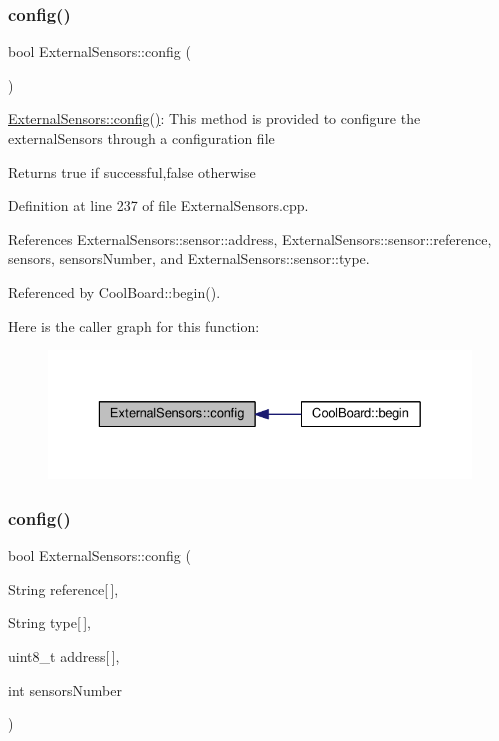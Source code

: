 \subsubsection{\texorpdfstring{config()}{config()}\hspace{0.1cm}{\footnotesize\ttfamily [1/2]}}
{\footnotesize\ttfamily bool External\+Sensors\+::config (\begin{DoxyParamCaption}{ }\end{DoxyParamCaption})}

\hyperlink{class_external_sensors_a862a4bd11346b37270d0244c2adabe5a}{External\+Sensors\+::config()}\+: This method is provided to configure the external\+Sensors through a configuration file

\begin{DoxyReturn}{Returns}
true if successful,false otherwise 
\end{DoxyReturn}


Definition at line 237 of file External\+Sensors.\+cpp.



References External\+Sensors\+::sensor\+::address, External\+Sensors\+::sensor\+::reference, sensors, sensors\+Number, and External\+Sensors\+::sensor\+::type.



Referenced by Cool\+Board\+::begin().

Here is the caller graph for this function\+:\nopagebreak
\begin{figure}[H]
\begin{center}
\leavevmode
\includegraphics[width=329pt]{d1/d2f/class_external_sensors_a862a4bd11346b37270d0244c2adabe5a_icgraph}
\end{center}
\end{figure}
\mbox{\label{class_external_sensors_ac829858f587e15a3fcb00567248f0edd}} 
\subsubsection{\texorpdfstring{config()}{config()}\hspace{0.1cm}{\footnotesize\ttfamily [2/2]}}
{\footnotesize\ttfamily bool External\+Sensors\+::config (\begin{DoxyParamCaption}\item[{String}]{reference\mbox{[}$\,$\mbox{]},  }\item[{String}]{type\mbox{[}$\,$\mbox{]},  }\item[{uint8\+\_\+t}]{address\mbox{[}$\,$\mbox{]},  }\item[{int}]{sensors\+Number }\end{DoxyParamCaption})}

